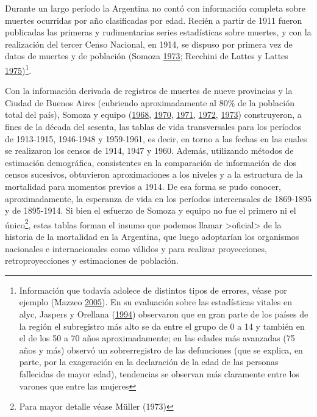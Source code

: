 \documentclass[12pt,spanish,]{article}
\let\rmarkdownfootnote\footnote%
\def\footnote{\protect\rmarkdownfootnote}
\begin{document}
Durante un largo período la Argentina no contó con información completa
sobre muertes ocurridas por año clasificadas por edad. Recién a partir
de 1911 fueron publicadas las primeras y rudimentarias series
estadísticas sobre muertes, y con la realización del tercer Censo
Nacional, en 1914, se dispuso por primera vez de datos de muertes y de
población (Somoza \protect\hyperlink{ref-Somoza1973}{1973}; Recchini de
Lattes y Lattes
\protect\hyperlink{ref-RecchinideLattes1975}{1975})\footnote{Información
  que todavía adolece de distintos tipos de errores, véase por ejemplo
  (Mazzeo \protect\hyperlink{ref-Mazzeo2005}{2005}). En su evaluación
  sobre las estadísticas vitales en \gls{alyc}, Jaspers y Orellana
  (\protect\hyperlink{ref-JaspersOrellana1994}{1994}) observaron que en
  gran parte de los países de la región el subregistro más alto se da
  entre el grupo de 0 a 14 y también en el de los 50 a 70 años
  aproximadamente; en las edades más avanzadas (75 años y más) observó
  un sobrerregistro de las defunciones (que se explica, en parte, por la
  exageración en la declaración de la edad de las personas fallecidas de
  mayor edad), tendencias se observan más claramente entre los varones
  que entre las mujeres}.

Con la información derivada de registros de muertes de nueve provincias
y la Ciudad de Buenos Aires (cubriendo aproximadamente al 80\% de la
población total del país), Somoza y equipo
(\protect\hyperlink{ref-Somoza1968}{1968},
\protect\hyperlink{ref-Somoza1970}{1970},
\protect\hyperlink{ref-Somoza1971}{1971},
\protect\hyperlink{ref-Somoza1972}{1972},
\protect\hyperlink{ref-Somoza1973}{1973}) construyeron, a fines de la
década del sesenta, las tablas de vida transversales para los períodos
de 1913-1915, 1946-1948 y 1959-1961, es decir, en torno a las fechas en
las cuales se realizaron los censos de 1914, 1947 y 1960. Además,
utilizando métodos de estimación demográfica, consistentes en la
comparación de información de dos censos sucesivos, obtuvieron
aproximaciones a los niveles y a la estructura de la mortalidad para
momentos previos a 1914. De esa forma se pudo conocer, aproximadamente,
la esperanza de vida en los períodos intercensales de 1869-1895 y de
1895-1914. Si bien el esfuerzo de Somoza y equipo no fue el primero ni
el único\footnote{Para mayor detalle véase Müller (1973)}, estas tablas
forman el insumo que podemos llamar \textgreater{}oficial\textgreater{}
de la historia de la mortalidad en la Argentina, que luego adoptarían
los organismos nacionales e internacionales como válidos y para realizar
proyecciones, retroproyecciones y estimaciones de población.
\end{document}
